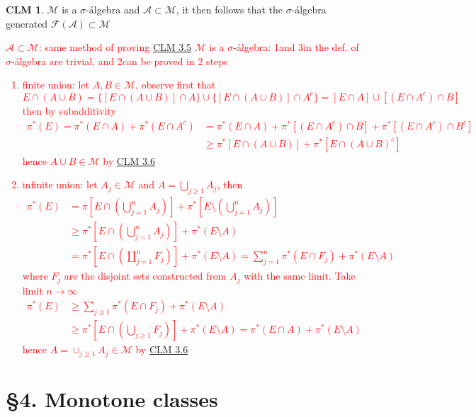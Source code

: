 \documentclass[hidelinks]{article}
\theoremstyle{definition}
\theoremstyle{dotless}
\newtheorem{claim}{CLM}[section]
\theoremstyle{remark}
\begin{document}
\begin{claim}
$\mathscr{M}$ is a $\sigma$-álgebra and $\mathscr{A}\subset\mathscr{M}$, it then follows that the $\sigma$-álgebra generated $\mathscr{F}(\mathscr{A})\subset\mathscr{M}$
\end{claim}
\textcolor{red}{$\mathscr{A}\subset\mathscr{M}$: same method of proving \hyperref[CLM 3.5]{CLM 3.5}\newline
$\mathscr{M}$ is a $\sigma$-álgebra: 1\degree and 3\degree in the def. of $\sigma$-álgebra are trivial, and 2\degree can be proved in 2 steps \begin{enumerate}[label=\arabic*\degree]
    \item finite union: let $A,B\in\mathscr{M}$, observe first that
    \[E\cap(A\cup B)=\{[E\cap(A\cup B)]\cap A\}\cup\{[E\cap(A\cup B)]\cap A^c\}=[E\cap A]\cup[(E\cap A^c)\cap B]\] then by subadditivity
    \begin{equation*}
    \begin{split}
        \pi^*(E)=\pi^*(E\cap A)+\pi^*(E\cap A^c)& =\pi^*(E\cap A)+\pi^*[(E\cap A^c)\cap B]+\pi^*[(E\cap A^c)\cap B^c] \\ & \geq\pi^*[E\cap(A\cup B)]+\pi^*[E\cap(A\cup B)^c]
    \end{split}
    \end{equation*}
    hence $A\cup B\in\mathscr{M}$ by \hyperref[CLM 3.6]{CLM 3.6}
    \item infinite union: let $A_j\in\mathscr{M}$ and $A=\bigcup_{j\geq1}A_j$, then
    \begin{equation*}
    \begin{split}
        \pi^*(E)&=\pi[E\cap(\bigcup_{j=1}^nA_j)]+\pi^*[E\setminus(\bigcup\limits_{j=1}^nA_j)]\\ &\geq\pi^*[E\cap(\bigcup_{j=1}^nA_j)]+\pi^*(E\setminus A)\\
        &=\pi^*[E\cap(\coprod_{j=1}^nF_j)]+\pi^*(E\setminus A)=\sum_{j=1}^n\pi^*(E\cap F_j)+\pi^*(E\setminus A)
    \end{split} 
    \end{equation*}
    where $F_j$ are the disjoint sets constructed from $A_j$ with the same limit.\newline
    Take limit $n\to\infty$
    \begin{equation*}
    \begin{split}
        \pi^*(E)&\geq\sum_{j\geq1}\pi^*(E\cap F_j)+\pi^*(E\setminus A)\\
        &\geq\pi^*[E\cap(\bigcup_{j\geq1}F_j)]+\pi^*(E\setminus A)=\pi^*(E\cap A)+\pi^*(E\setminus A)
    \end{split}
    \end{equation*}
    hence $A=\cup_{j\geq1}A_j\in\mathscr{M}$ by \hyperref[CLM 3.6]{CLM 3.6}
\end{enumerate}}





\newpage
\section*{\S4. Monotone classes}
\setcounter{section}{4}
\end{document}
